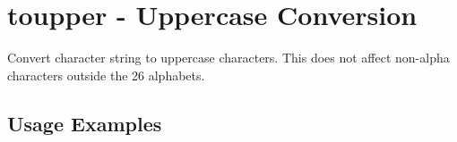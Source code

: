 
%

\section{toupper - Uppercase Conversion\label{sect:toupper}}
Convert character string to uppercase characters. This does not affect non-alpha characters outside the 26 alphabets.

\subsection*{Usage Examples}


%

